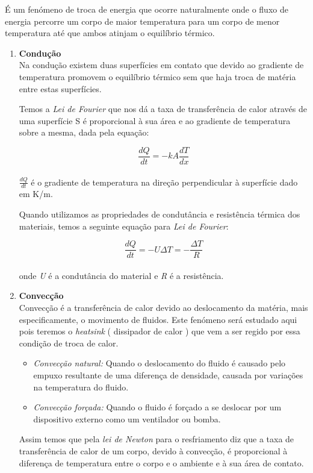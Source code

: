 É um fenómeno de troca de energia que ocorre naturalmente onde o fluxo de energia percorre um corpo de maior temperatura para um corpo de menor temperatura até que ambos atinjam o equilíbrio térmico. 

\begin{enumerate}
\item \textbf{Condução}\\ 
Na condução existem duas superfícies em contato que devido ao gradiente de temperatura promovem o equilíbrio térmico sem que haja troca de matéria entre estas superfícies.

Temos a \emph{Lei de Fourier} que nos dá a taxa de transferência de
calor através de uma superfície S é proporcional à sua área e ao gradiente de temperatura sobre a mesma, dada pela equação:

\[\frac{dQ}{dt}=-k A \frac{dT}{dx}\] \\

$ \frac{dQ}{dt} $ é o gradiente de temperatura na direção perpendicular à superfície dado em K/m.

Quando utilizamos as propriedades de condutância e resistência térmica dos materiais, temos a seguinte equação para \emph{Lei de Fourier}:

\[\frac{dQ}{dt}=-U \Delta T = -\frac{\Delta T}{R}\] \\

onde \emph{U} é a condutância do material e \emph{R} é a resistência.
\item \textbf{Convecção} \\
Convecção é a transferência de calor devido ao deslocamento da matéria, mais especificamente, o movimento de fluidos.
Este fenómeno será estudado aqui pois teremos o \emph{heatsink} ( dissipador de calor ) que vem a ser regido por essa condição de troca de calor.
 \begin{itemize}
 \item \textit{Convecção natural:} Quando o deslocamento do fluido é causado pelo empuxo resultante
de uma diferença de densidade, causada por variações na temperatura do
fluido.
\item \textit{Convecção forçada:} Quando o fluido é forçado a se deslocar por um dispositivo
externo como um ventilador ou bomba.
 \end{itemize}
 Assim temos que pela \emph{lei de Newton} para o resfriamento diz que a taxa de transferência de calor de
um corpo, devido à convecção, é proporcional à diferença de temperatura entre o corpo e
o ambiente e à sua área de contato.


\end{enumerate}

